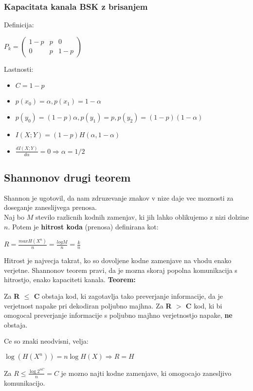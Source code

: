 \documentclass{article}
\begin{document}
\begin{multicols}{2}
	\subsubsection{Kapacitata kanala BSK z brisanjem}
	Definicija:
	\begin{center}
		\begin{math}
			P_k =
			\begin{pmatrix}
				1-p & p & 0   \\
				0   & p & 1-p
			\end{pmatrix}
		\end{math}
	\end{center}
	Lastnosti:
	\begin{itemize}
		\item $C = 1 - p$
		\item $p(x_0) = \alpha, p(x_1) = 1 - \alpha$
		\item $p(y_0) = (1-p)\alpha, p(y_1) = p, p(y_2) = (1-p)(1-\alpha)$
		\item $I(X;Y) = (1-p)H(\alpha, 1 - \alpha)$
		\item $\frac{dI(X;Y)}{d \alpha} = 0 \Rightarrow \alpha = 1/2$
	\end{itemize}

	\subsection{Shannonov drugi teorem}
	Shannon je ugotovil, da nam zdruzevanje znakov v nize daje vec moznosti za doseganje zaneslijvega prenosa.\\
	Naj bo $M$ stevilo razlicnih kodnih zamenjav, ki jih lahko oblikujemo z nizi dolzine $n$. Potem je \textbf{hitrost koda}
	(prenosa)  definirana kot:
	\begin{center}
		\begin{math}
			R = \frac{max H(X^n)}{n} = \frac{log M}{n} = \frac{k}{n}
		\end{math}
	\end{center}
	Hitrost je najvecja takrat, ko so dovoljene kodne zamenjave na vhodu enako verjetne. Shannonov teorem pravi, da je mozna
	skoraj popolna komunikacija s hitrostjo, enako kapaciteti kanala.
	\textbf{Teorem:}\\
	\begin{center}
		Za \textbf{R $\leq$ C} obstaja kod, ki zagotavlja tako preverjanje informacije, da je verjetnost napake pri
		dekodiran  poljubno majhna. Za \textbf{R $>$ C} kod, ki bi omogocal preverjanje informacije s poljubno majhno
		verjetnostjo napake, \textbf{ne} obstaja.
	\end{center}
	Ce so znaki neodvisni, velja:
	\begin{center}
		\begin{math}
			\log(H(X^n)) = n \log H(X) \Rightarrow R = H
		\end{math}
	\end{center}
	Za $R \leq \frac{\log 2^{nC}}{n} = C$ je mozno najti kodne zamenjave, ki omogocajo zanesljivo komunikacijo.


\end{multicols}
\end{document}
